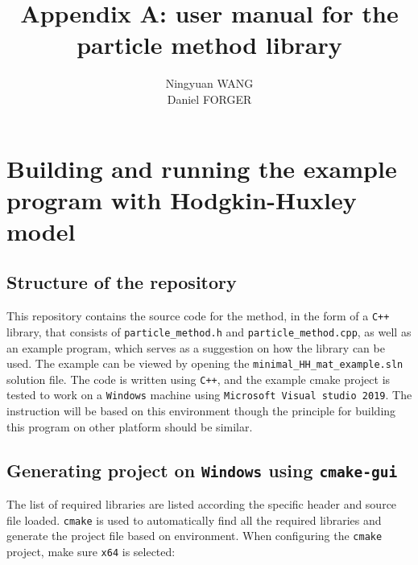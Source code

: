 \documentclass[10pt]{article} %
\title{Appendix A: user manual for the particle method library}
\author{\sc Ningyuan WANG\\Daniel FORGER
}
\begin{document}
\setlength{\parindent}{0pt}
\maketitle

\section{Building and running the example program with Hodgkin-Huxley model}
\subsection{Structure of the repository}
This repository contains the source code for the method, in the form of a \texttt{C++} library, that consists of \texttt{particle\_method.h} and \texttt{particle\_method.cpp}, as well as an example program, which serves as a suggestion on how the library can be used. The example can be viewed by opening the \texttt{minimal\_HH\_mat\_example.sln} solution file.
The code is written using \texttt{C++}, and the example cmake project is tested to work on a \texttt{Windows} machine using \texttt{Microsoft Visual studio 2019}. The instruction will be based on this environment though the principle for building this program on other platform should be similar.
\subsection{Generating project on \texttt{Windows} using \texttt{cmake-gui}}
The list of required libraries are listed according the specific header and source file loaded. \texttt{cmake} is used to automatically find all the required libraries and generate the project file based on environment. When configuring the \texttt{cmake} project, make sure \texttt{x64} is selected:
\end{document}
